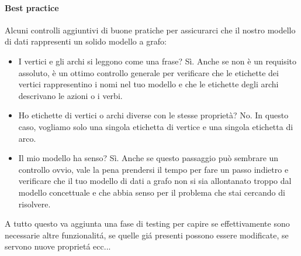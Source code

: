 \paragraph{Best practice} Alcuni controlli aggiuntivi di buone pratiche per assicurarci che il nostro modello di dati rappresenti un solido modello a grafo:

\begin{itemize}
  \item I vertici e gli archi si leggono come una frase? Sì. Anche se non è un requisito assoluto, è un ottimo controllo generale per verificare che le etichette dei vertici rappresentino i nomi nel tuo modello e che le etichette degli archi descrivano le azioni o i verbi.
  
  \item Ho etichette di vertici o archi diverse con le stesse proprietà? No. In questo caso, vogliamo solo una singola etichetta di vertice e una singola etichetta di arco.
  
  \item Il mio modello ha senso? Sì. Anche se questo passaggio può sembrare un controllo ovvio, vale la pena prendersi il tempo per fare un passo indietro e verificare che il tuo modello di dati a grafo non si sia allontanato troppo dal modello concettuale e che abbia senso per il problema che stai cercando di risolvere.
\end{itemize}
A tutto questo va aggiunta una fase di testing per capire se effettivamente sono necessarie altre funzionalitá, se quelle giá presenti possono essere modificate, se servono nuove proprietá ecc...